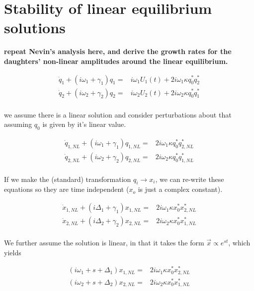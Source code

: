 \section*{Stability of linear equilibrium solutions}

\textbf{repeat Nevin's analysis here, and derive the growth rates for the daughters' non-linear amplitudes around the linear equilibrium.}

\begin{subequations}
\begin{align}
\dot{q}_1 + (i\omega_1 + \gamma_1)q_1 = & i\omega_1 U_1(t) + 2i\omega_1\kappa q_0^\ast q_2^\ast \\
\dot{q}_2 + (i\omega_2 + \gamma_2)q_2 = & i\omega_2 U_2(t) + 2i\omega_2\kappa q_0^\ast q_1^\ast \\
\end{align}
\end{subequations}

we assume there is a linear solution and consider perturbations about that assuming $q_0$ is given by it's linear value.

\begin{subequations}
\begin{align}
\dot{q}_{1,NL} + (i\omega_1 + \gamma_1)q_{1,NL} = & 2i\omega_1\kappa q_0^\ast q_{2,NL}^\ast \\
\dot{q}_{2,NL} + (i\omega_2 + \gamma_2)q_{2,NL} = & 2i\omega_2\kappa q_0^\ast q_{1,NL}^\ast \\
\end{align}
\end{subequations}

If we make the (standard) transformation $q_i \rightarrow x_i$, we can re-write these equations so they are time independent ($x_o$ is just a complex constant).

\begin{subequations}
\begin{align}
\dot{x}_{1,NL} + (i\Delta_1 + \gamma_1)x_{1,NL} = & 2i\omega_1\kappa x_0^\ast x_{2,NL}^\ast \\
\dot{x}_{2,NL} + (i\Delta_2 + \gamma_2)x_{2,NL} = & 2i\omega_2\kappa x_0^\ast x_{1,NL}^\ast \\
\end{align}
\end{subequations}

We further assume the solution is linear, in that it takes the form $\vec{x} \propto e^{st}$, which yields

\begin{subequations}
\begin{align}
(i\omega_1 + s+\Delta_1)x_{1,NL} = & 2i\omega_1\kappa x_0^\ast x_{2,NL}^\ast \\
(i\omega_2 + s+\Delta_2)x_{2,NL} = & 2i\omega_2\kappa x_0^\ast x_{1,NL}^\ast \\
\end{align}
\end{subequations}

